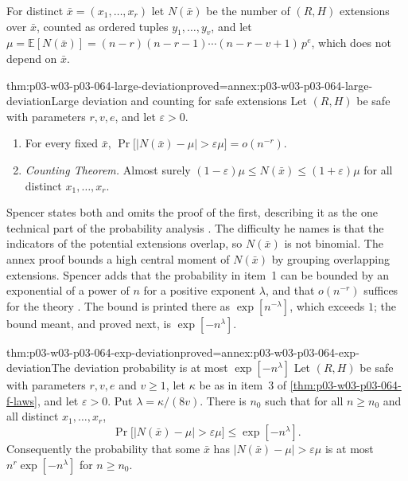 For distinct \(\bar x=(x_1,\ldots,x_r)\) let \(N(\bar x)\) be the number of
\((R,H)\) extensions over \(\bar x\), counted as ordered tuples
\(y_1,\ldots,y_v\), and let \(\mu=\mathbb E[N(\bar x)]=(n-r)(n-r-1)\cdots
(n-r-v+1)\,p^e\), which does not depend on \(\bar x\).

\begin{hbtheorem}{thm:p03-w03-p03-064-large-deviation}{proved=annex:p03-w03-p03-064-large-deviation}{Large deviation and counting for safe extensions}
Let \((R,H)\) be safe with parameters \(r,v,e\), and let \(\varepsilon>0\).
\begin{enumerate}
\item For every fixed \(\bar x\),
  \(\Pr\bigl[|N(\bar x)-\mu|>\varepsilon\mu\bigr]=o(n^{-r})\).
\item \emph{Counting Theorem.}  Almost surely
  \((1-\varepsilon)\mu\leq N(\bar x)\leq(1+\varepsilon)\mu\) for all
  distinct \(x_1,\ldots,x_r\).
\end{enumerate}
\end{hbtheorem}

Spencer states both and omits the proof of the first, describing it as the
one technical part of the probability analysis
\cite[pp.~10--11]{Spencer2007LogicRandomStructuresAuthor}.  The difficulty
he names is that the indicators of the potential extensions overlap, so
\(N(\bar x)\) is not binomial.  The annex proof bounds a high central moment
of \(N(\bar x)\) by grouping overlapping extensions.  Spencer adds that the
probability in item~1 can be bounded by an exponential of a power of \(n\)
for a positive exponent \(\lambda\), and that \(o(n^{-r})\) suffices for the
theory \cite[p.~10]{Spencer2007LogicRandomStructuresAuthor}.  The bound is
printed there as \(\exp[n^{-\lambda}]\), which exceeds \(1\); the bound
meant, and proved next, is \(\exp[-n^{\lambda}]\).

\begin{hbcorollary}{thm:p03-w03-p03-064-exp-deviation}{proved=annex:p03-w03-p03-064-exp-deviation}{The deviation probability is at most \(\exp[-n^{\lambda}]\)}
Let \((R,H)\) be safe with parameters \(r,v,e\) and \(v\geq1\), let
\(\kappa\) be as in item~3 of \cref{thm:p03-w03-p03-064-f-laws}, and let
\(\varepsilon>0\).  Put \(\lambda=\kappa/(8v)\).  There is \(n_0\) such that
for all \(n\geq n_0\) and all distinct \(x_1,\ldots,x_r\),
\[
  \Pr\bigl[|N(\bar x)-\mu|>\varepsilon\mu\bigr]\leq\exp[-n^{\lambda}].
\]
Consequently the probability that some \(\bar x\) has
\(|N(\bar x)-\mu|>\varepsilon\mu\) is at most \(n^r\exp[-n^{\lambda}]\) for
\(n\geq n_0\).
\end{hbcorollary}

